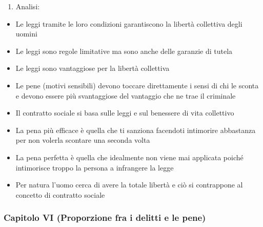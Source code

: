 \documentclass{article}
\begin{document}
\begin{enumerate}
    \item Analisi:
\end{enumerate}
\begin{itemize}
    \item Le leggi tramite le loro condizioni garantiscono la libertà collettiva degli uomini 
    \item Le leggi sono regole limitative ma sono anche delle garanzie di tutela
    \item Le leggi sono vantaggiose per la libertà collettiva
    \item Le pene (motivi sensibili) devono toccare direttamente i sensi di chi le sconta e 
    devono essere più svantaggiose del vantaggio che ne trae il criminale
    \item Il contratto sociale si basa sulle leggi e sul benessere di vita collettivo
    \item La pena più efficace è quella che ti sanziona facendoti intimorire abbastanza per 
    non volerla scontare una seconda volta
    \item La pena perfetta è quella che idealmente non viene mai applicata poiché intimorisce troppo la persona a infrangere la legge
    \item Per natura l'uomo cerca di avere la totale libertà e ciò si contrappone al concetto 
    di contratto sociale
\end{itemize}

\newpage
\subsubsection{Capitolo VI (Proporzione fra i delitti e le pene)}
\end{document}
